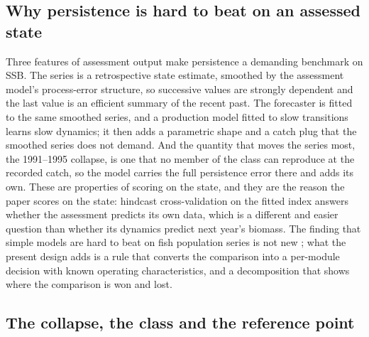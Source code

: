 \documentclass[preprint,11pt,authoryear]{elsarticle}
\theoremstyle{definition}
\theoremstyle{remark}
\begin{document}
\subsection{Why persistence is hard to beat on an assessed state}\label{sec:whypersist}

Three features of assessment output make persistence a demanding benchmark on SSB. The series is a retrospective state estimate, smoothed by the assessment model's process-error structure, so successive values are strongly dependent and the last value is an efficient summary of the recent past. The forecaster is fitted to the same smoothed series, and a production model fitted to slow transitions learns slow dynamics; it then adds a parametric shape and a catch plug that the smoothed series does not demand. And the quantity that moves the series most, the 1991--1995 collapse, is one that no member of the class can reproduce at the recorded catch, so the model carries the full persistence error there and adds its own. These are properties of scoring on the state, and they are the reason the paper scores on the state: hindcast cross-validation on the fitted index \citep{Kell2016,Kell2021,Carvalho2021} answers whether the assessment predicts its own data, which is a different and easier question than whether its dynamics predict next year's biomass. The finding that simple models are hard to beat on fish population series is not new \citep{Ward2014,Perretti2013}; what the present design adds is a rule that converts the comparison into a per-module decision with known operating characteristics, and a decomposition that shows where the comparison is won and lost.

\subsection{The collapse, the class and the reference point}\label{sec:classrp}
\end{document}
